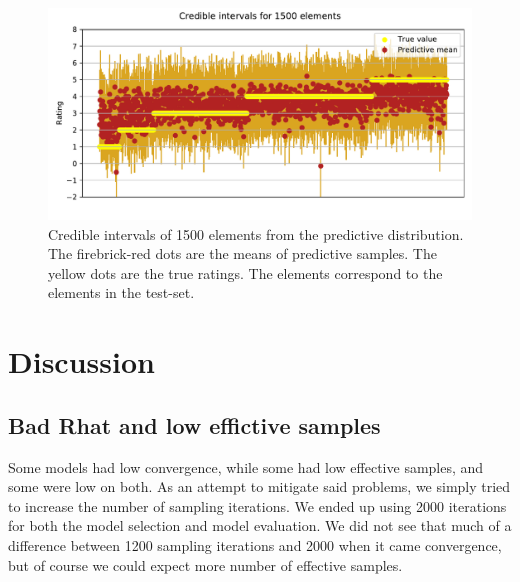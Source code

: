 \documentclass[12pt]{article}
\begin{document}
\begin{figure}[H]
    \centering
    \caption{Credible intervals of 1500 elements from the predictive distribution. The firebrick-red dots are the means of predictive samples. The yellow dots are the true ratings. The elements correspond to the elements in the test-set.}
    \includegraphics[width=\textwidth]{credibles.pdf}
\end{figure}

\section{Discussion}
    \subsection*{Bad Rhat and low effictive samples}
    Some models had low convergence, while some had low effective samples, and some were low on both. As an attempt to mitigate said problems, we simply tried to increase the number of sampling iterations. We ended up using 2000 iterations for both the model selection and model evaluation. We did not see that much of a difference between 1200 sampling iterations and 2000 when it came convergence, but of course we could expect more number of effective samples.

% 


\end{document}
